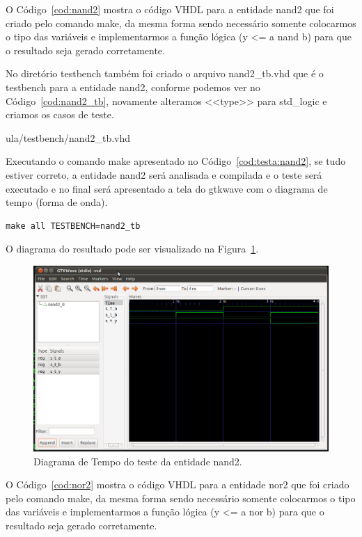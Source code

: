 \documentclass[a4paper,11pt]{report}
\begin{document}
O Código~\ref{cod:nand2} mostra o código VHDL para a entidade nand2 que foi criado pelo comando make, da mesma forma sendo necessário somente colocarmos o tipo das variáveis e implementarmos a função lógica (y <= a nand b) para que o resultado seja gerado corretamente.

\lstset{language=VHDL}
\lstset{numbers=left, numberstyle=\tiny, stepnumber=1, numbersep=3pt}


No diretório testbench também foi criado o arquivo nand2\_tb.vhd que é o testbench para a entidade nand2, conforme podemos ver no Código~\ref{cod:nand2_tb}, novamente alteramos <<type>> para std\_logic e criamos os casos de teste.

\lstset{language=VHDL}
\lstset{numbers=left, numberstyle=\tiny, stepnumber=1, numbersep=3pt}
 {ula/testbench/nand2_tb.vhd}

Executando o comando make apresentado no Código~\ref{cod:testa:nand2}, se tudo estiver correto, a entidade nand2 será analisada e compilada e o teste será executado e no final será apresentado a tela do gtkwave com o diagrama de tempo (forma de onda).

\lstset{numbers=left, numberstyle=\tiny, stepnumber=1, numbersep=3pt}
\begin{lstlisting}[label=cod:testa:nand2,caption=Comando para executar o testbench da entidade nand2.]
  make all TESTBENCH=nand2_tb
\end{lstlisting}

O diagrama do resultado pode ser visualizado na Figura~\ref{fig:gtw:nand2}.

\begin{figure}[H]
\centering
\includegraphics[width=1\textwidth]{figuras/gtw_nand2.png}
\caption{Diagrama de Tempo do teste da entidade nand2.}
\label{fig:gtw:nand2}
\end{figure}
O Código~\ref{cod:nor2} mostra o código VHDL para a entidade nor2 que foi criado pelo comando make, da mesma forma sendo necessário somente colocarmos o tipo das variáveis e implementarmos a função lógica (y <= a nor b) para que o resultado seja gerado corretamente.
\end{document}
